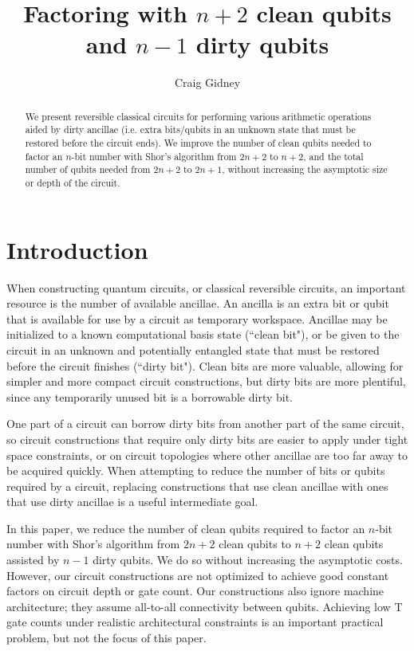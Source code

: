 \documentclass[twocolumn,longbibliography]{quantumarticle-customized}
\title{Factoring with $n+2$ clean qubits and $n-1$ dirty qubits}
\author{Craig Gidney}
\affiliation{Google, Santa Barbara, CA 93117, USA}
\begin{document}
\maketitle

\begin{abstract}
We present reversible classical circuits for performing various arithmetic operations aided by dirty ancillae (i.e. extra bits/qubits in an unknown state that must be restored before the circuit ends).
We improve the number of clean qubits needed to factor an $n$-bit number with Shor's algorithm \cite{Shor1999} from $2n+2$ \cite{takahashi2006, haner2016} to $n+2$, and the total number of qubits needed from $2n+2$ to $2n+1$, without increasing the asymptotic size or depth of the circuit.
\end{abstract}

\section{Introduction} \label{sec:introduction}

When constructing quantum circuits, or classical reversible circuits, an important resource is the number of available ancillae.
An ancilla is an extra bit or qubit that is available for use by a circuit as temporary workspace.
Ancillae may be initialized to a known computational basis state (``clean bit"), or be given to the circuit in an unknown and potentially entangled state that must be restored before the circuit finishes (``dirty bit").
Clean bits are more valuable, allowing for simpler and more compact circuit constructions, but dirty bits are more plentiful, since any temporarily unused bit is a borrowable dirty bit.

One part of a circuit can borrow dirty bits from another part of the same circuit, so circuit constructions that require only dirty bits are easier to apply under tight space constraints, or on circuit topologies where other ancillae are too far away to be acquired quickly.
When attempting to reduce the number of bits or qubits required by a circuit, replacing constructions that use clean ancillae with ones that use dirty ancillae is a useful intermediate goal.

In this paper, we reduce the number of clean qubits required to factor an $n$-bit number with Shor's algorithm from $2n+2$ clean qubits \cite{takahashi2006, haner2016} to $n+2$ clean qubits assisted by $n-1$ dirty qubits.
We do so without increasing the asymptotic costs.
However, our circuit constructions are not optimized to achieve good constant factors on circuit depth or gate count.
Our constructions also ignore machine architecture; they assume all-to-all connectivity between qubits.
Achieving low T gate counts under realistic architectural constraints is an important practical problem, but not the focus of this paper.
\end{document}
